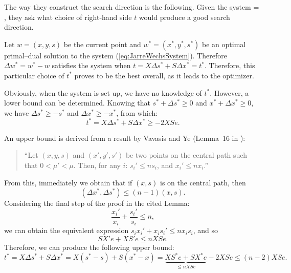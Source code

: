 
The way they construct the search direction is the following. 
Given the system
\be
\label{eq:JarreWechsSystem}
 =
\left[ \begin{array}{c}
    b-Ax \\ c-A^Ty-s \\ t
  \end{array} \right],
\ee
they ask what 
choice of right-hand side $t$ would produce a good search direction.

Let $w=(x,y,s)$ be the current point and 
$w^*=(x^*,y^*,s^*)$ be an optimal primal--dual solution to 
the system (\ref{eq:JarreWechsSystem}).
Therefore $\Delta w^*= w^*-w$ satisfies the 
system when $t=X\Delta s^* + S\Delta x^*=t^*$. Therefore,
this particular choice of $t^*$ proves to be the best overall,
as it leads to the optimizer.

Obviously, when the system is set up, we have no knowledge of 
$t^*$. However, a lower bound can be determined. Knowing that 
$s^*+\Delta s^* \ge 0$ and $x^*+\Delta x^* \ge 0$, we have 
$\Delta s^* \ge -s^*$ and $\Delta x^* \ge -x^*$, from which:
\[
t^*= X\Delta s^* + S\Delta x^* \ge -2XSe.
\]


An upper bound is derived from a result by Vavasis and Ye 
(Lemma~16 in \cite{VavasisYe}):
\begin{quote}
``Let $(x,y,s)$ and $(x',y',s')$ be two points on the central 
path such that $0<\mu'<\mu$. Then, for any $i$:
$s_i' \le ns_i$, and $x_i' \le nx_i$.''
\end{quote}

From this, immediately we obtain that if $(x,s)$ is on the 
central path, then
\[
(\Delta x^*,\Delta s^*)\le(n-1)(x,s).
\]
Considering the final step of the proof in the cited Lemma:
\[
\frac{x_i'}{x_i} +\frac{s_i'}{s_i} \le n,
\]
we can obtain the equivalent expression 
$s_ix_i' + x_is_i' \le nx_is_i$, and so
\[
SX'e + XS'e \le nXSe.
\]
Therefore, we can produce the following upper bound:
\[
t^*= X\Delta s^* +S\Delta x^* = X(s^*-s)+S(x^*-x) = 
     \underbrace{XS^*e + SX^*e}_{\le nXSe} -2XSe \le (n-2) XSe.
\]

